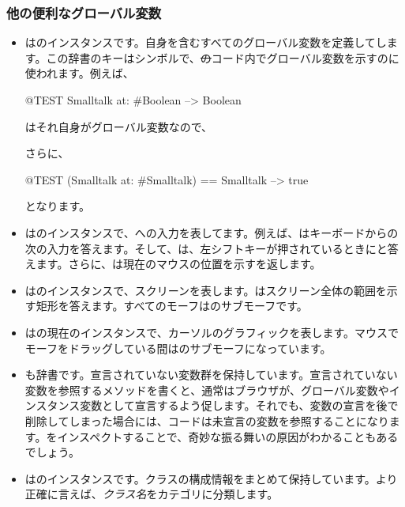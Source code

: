\documentclass[a4paper,10pt,twoside]{book}
\begin{document}
\subsubsection{他の便利なグローバル変数}

\begin{itemize}
\item
{}はのインスタンスです。自身を含むすべてのグローバル変数を定義してします。この辞書のキーはシンボルで、\st のコード内でグローバル変数を示すのに使われます。例えば、
\begin{code}{@TEST}
Smalltalk at: #Boolean --> Boolean
\end{code}
はそれ自身がグローバル変数なので、
\begin{code}{}
Smalltalk at: #Smalltalk-->a SystemDictionary(lots of globals)}
\end{code} 
さらに、
\begin{code}{@TEST}
(Smalltalk at: #Smalltalk) == Smalltalk --> true
\end{code}
となります。

\item {}はのインスタンスで、\pharo への入力を表してます。例えば、はキーボードからの次の入力を答えます。そして、は、左シフトキーが押されているときにと答えます。さらに、は現在のマウスの位置を示すを返します。


\item {}はのインスタンスで、スクリーンを表します。はスクリーン全体の範囲を示す矩形を答えます。すべてのモーフはのサブモーフです。

\item 
{}はの現在のインスタンスで、カーソルのグラフィックを表します。マウスでモーフをドラッグしている間はのサブモーフになっています。

\item
{}も辞書です。宣言されていない変数群を保持しています。宣言されていない変数を参照するメソッドを書くと、通常はブラウザが、グローバル変数やインスタンス変数として宣言するよう促します。それでも、変数の宣言を後で削除してしまった場合には、コードは未宣言の変数を参照することになります。をインスペクトすることで、奇妙な振る舞いの原因がわかることもあるでしょう。

\item
{}はのインスタンスです。クラスの構成情報をまとめて保持しています。より正確に言えば、\emph{クラス名}をカテゴリに分類します。
\end{itemize}
\end{document}
